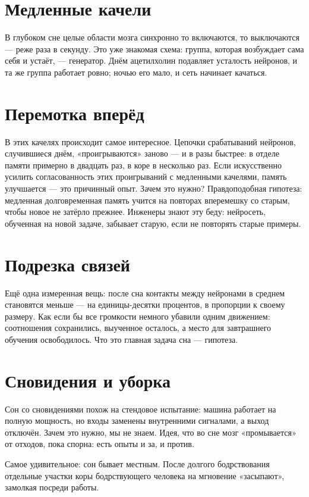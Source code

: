 \section*{Медленные качели}

В глубоком сне целые области мозга синхронно то включаются, то выключаются --- реже раза в секунду. Это уже знакомая схема: группа, которая возбуждает сама себя и устаёт, --- генератор. Днём ацетилхолин подавляет усталость нейронов, и та же группа работает ровно; ночью его мало, и сеть начинает качаться.


\section*{Перемотка вперёд}

В этих качелях происходит самое интересное. Цепочки срабатываний нейронов, случившиеся днём, «проигрываются» заново --- и в разы быстрее: в отделе памяти примерно в двадцать раз, в коре в несколько раз. Если искусственно усилить согласованность этих проигрываний с медленными качелями, память улучшается --- это причинный опыт. Зачем это нужно? Правдоподобная гипотеза: медленная долговременная память учится на повторах вперемешку со старым, чтобы новое не затёрло прежнее. Инженеры знают эту беду: нейросеть, обученная на новой задаче, забывает старую, если не повторять старые примеры.

\section*{Подрезка связей}

Ещё одна измеренная вещь: после сна контакты между нейронами в среднем становятся меньше --- на единицы-десятки процентов, в пропорции к своему размеру. Как если бы все громкости немного убавили одним движением: соотношения сохранились, выученное осталось, а место для завтрашнего обучения освободилось. Что это главная задача сна --- гипотеза.

\section*{Сновидения и уборка}

Сон со сновидениями похож на стендовое испытание: машина работает на полную мощность, но входы заменены внутренними сигналами, а выход отключён. Зачем это нужно, мы не знаем. Идея, что во сне мозг «промывается» от отходов, пока спорна: есть опыты и за, и против.

Самое удивительное: сон бывает местным. После долгого бодрствования отдельные участки коры бодрствующего человека на мгновение «засыпают», замолкая посреди работы.

